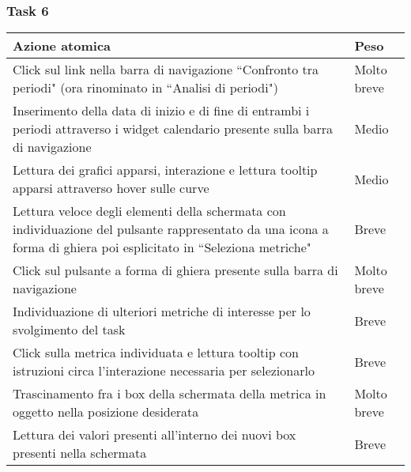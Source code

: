 \subsubsection{Task 6}
\label{sss:iaa-task-6}

{
\renewcommand{\arraystretch}{2}
\begin{longtable}[h]{| p{14cm} | p{2.5cm} |}
    \hline
    \textbf{Azione atomica} & \textbf{Peso} \\
    \hline
    \endhead
    Click sul link nella barra di navigazione ``Confronto tra periodi" (ora rinominato in ``Analisi di periodi") & Molto breve \\
    \hline
    Inserimento della data di inizio e di fine di entrambi i periodi attraverso i widget calendario presente sulla barra di navigazione & Medio \\
    \hline
    Lettura dei grafici apparsi, interazione e lettura tooltip apparsi attraverso hover sulle curve & Medio \\
    \hline
    Lettura veloce degli elementi della schermata con individuazione del pulsante rappresentato da una icona a forma di ghiera poi esplicitato in ``Seleziona metriche" & Breve \\
    \hline
    Click sul pulsante a forma di ghiera presente sulla barra di navigazione & Molto breve \\
    \hline
    Individuazione di ulteriori metriche di interesse per lo svolgimento del task & Breve \\
    \hline
    Click sulla metrica individuata e lettura tooltip con istruzioni circa l'interazione necessaria per selezionarlo & Breve \\
    \hline
    Trascinamento fra i box della schermata della metrica in oggetto nella posizione desiderata & Molto breve \\
    \hline
    Lettura dei valori presenti all'interno dei nuovi box presenti nella schermata & Breve \\
    \hline
\end{longtable}
}
